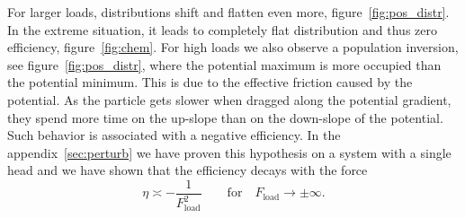 \documentclass[aps,pre,twocolumn,showpacs,showkeys,superscriptaddress,floatfix]{revtex4-1}
\begin{document}
For larger loads, distributions shift and flatten even more, figure~\ref{fig:pos_distr}. 
In the extreme situation, it leads to completely flat distribution and thus zero efficiency, figure~\ref{fig:chem}.
For high loads we also observe a population inversion, see figure~\ref{fig:pos_distr}, 
where the potential maximum is more occupied than the potential minimum. 
This is due to the effective friction caused by the potential. 
As the particle gets slower when dragged along the potential gradient, 
 they spend more time on the up-slope than on the down-slope of the potential.
Such behavior is associated with a negative efficiency. 
In the appendix~\ref{sec:perturb} we have proven this hypothesis on a system with a single head and we have shown that the efficiency decays with the force 
\[
\eta \asymp - \frac{1}{ F_\text{load}^2 } \qquad \text{for} \quad F_\text{load} \to \pm \infty .
\]
\end{document}
